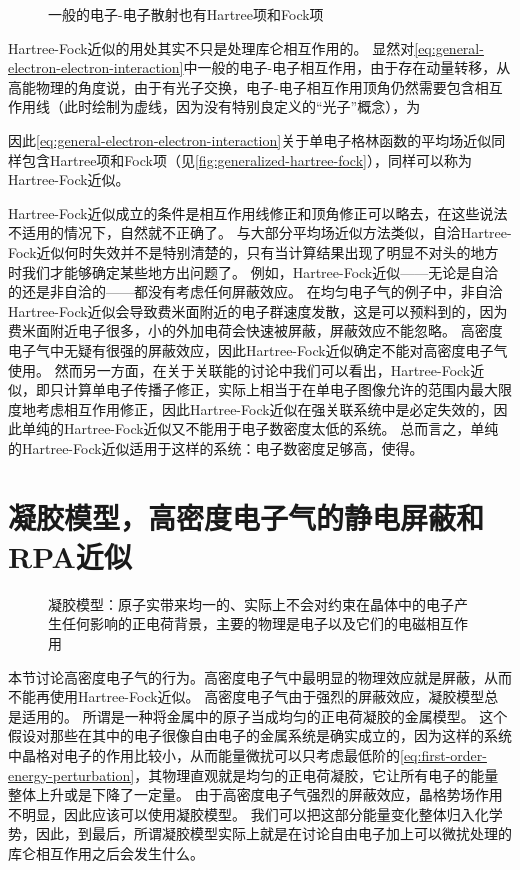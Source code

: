 \begin{figure}
    \centering
    
    \caption{一般的电子-电子散射也有Hartree项和Fock项}
    \label{fig:generalized-hartree-fock}
\end{figure}

Hartree-Fock近似的用处其实不只是处理库仑相互作用的。
显然对\eqref{eq:general-electron-electron-interaction}中一般的电子-电子相互作用，由于存在动量转移，从高能物理的角度说，由于有光子交换，电子-电子相互作用顶角仍然需要包含相互作用线（此时绘制为虚线，因为没有特别良定义的“光子”概念），为

因此\eqref{eq:general-electron-electron-interaction}关于单电子格林函数的平均场近似同样包含Hartree项和Fock项（见\autoref{fig:generalized-hartree-fock}），同样可以称为Hartree-Fock近似。

Hartree-Fock近似成立的条件是相互作用线修正和顶角修正可以略去，在这些说法不适用的情况下，自然就不正确了。
与大部分平均场近似方法类似，自洽Hartree-Fock近似何时失效并不是特别清楚的，只有当计算结果出现了明显不对头的地方时我们才能够确定某些地方出问题了。
例如，Hartree-Fock近似——无论是自洽的还是非自洽的——都没有考虑任何屏蔽效应。
在均匀电子气的例子中，非自洽Hartree-Fock近似会导致费米面附近的电子群速度发散，这是可以预料到的，因为费米面附近电子很多，小的外加电荷会快速被屏蔽，屏蔽效应不能忽略。
高密度电子气中无疑有很强的屏蔽效应，因此Hartree-Fock近似确定不能对高密度电子气使用。
然而另一方面，在关于关联能的讨论中我们可以看出，Hartree-Fock近似，即只计算单电子传播子修正，实际上相当于在单电子图像允许的范围内最大限度地考虑相互作用修正，因此Hartree-Fock近似在强关联系统中是必定失效的，因此单纯的Hartree-Fock近似又不能用于电子数密度太低的系统。
总而言之，单纯的Hartree-Fock近似适用于这样的系统：电子数密度足够高，使得。

\section{凝胶模型，高密度电子气的静电屏蔽和RPA近似}\label{sec:high-density}

\begin{figure}
    \centering
    
    \caption{凝胶模型：原子实带来均一的、实际上不会对约束在晶体中的电子产生任何影响的正电荷背景，主要的物理是电子以及它们的电磁相互作用}
\end{figure}

本节讨论高密度电子气的行为。高密度电子气中最明显的物理效应就是屏蔽，从而不能再使用Hartree-Fock近似。
高密度电子气由于强烈的屏蔽效应，凝胶模型总是适用的。
所谓是一种将金属中的原子当成均匀的正电荷凝胶的金属模型。
这个假设对那些在其中的电子很像自由电子的金属系统是确实成立的，因为这样的系统中晶格对电子的作用比较小，从而能量微扰可以只考虑最低阶的\eqref{eq:first-order-energy-perturbation}，其物理直观就是均匀的正电荷凝胶，它让所有电子的能量整体上升或是下降了一定量。
由于高密度电子气强烈的屏蔽效应，晶格势场作用不明显，因此应该可以使用凝胶模型。
我们可以把这部分能量变化整体归入化学势，因此，到最后，所谓凝胶模型实际上就是在讨论自由电子加上可以微扰处理的库仑相互作用之后会发生什么。

